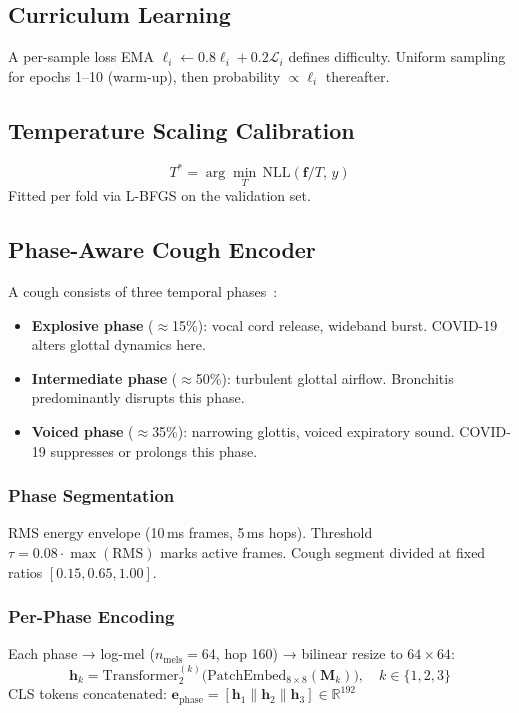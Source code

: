 \documentclass[journal]{IEEEtran}
\newcommand{\R}{\mathbb{R}}
\newcommand{\Lc}{\mathcal{L}}
\begin{document}
\subsection{Curriculum Learning}
\label{sec:curriculum}

A per-sample loss EMA $\ell_i \leftarrow 0.8\ell_i + 0.2\Lc_i$
defines difficulty. Uniform sampling for epochs 1--10 (warm-up),
then probability $\propto \ell_i$ thereafter.

\subsection{Temperature Scaling Calibration}
\label{sec:calibration}

\begin{equation}
T^* = \arg\min_T\,\mathrm{NLL}(\mathbf{f}/T,\,y)
\label{eq:calibration}
\end{equation}
Fitted per fold via L-BFGS on the validation set.

\subsection{Phase-Aware Cough Encoder}
\label{sec:phase}

A cough consists of three temporal phases~\cite{shi2018phases}:
\begin{itemize}
\item \textbf{Explosive phase} ($\approx$15\%): vocal cord release,
wideband burst. COVID-19 alters glottal dynamics here.
\item \textbf{Intermediate phase} ($\approx$50\%): turbulent glottal
airflow. Bronchitis predominantly disrupts this phase.
\item \textbf{Voiced phase} ($\approx$35\%): narrowing glottis,
voiced expiratory sound. COVID-19 suppresses or prolongs this phase.
\end{itemize}

\subsubsection{Phase Segmentation}
RMS energy envelope (10\,ms frames, 5\,ms hops). Threshold
$\tau = 0.08 \cdot \max(\text{RMS})$ marks active frames.
Cough segment divided at fixed ratios $[0.15, 0.65, 1.00]$.

\subsubsection{Per-Phase Encoding}
Each phase → log-mel ($n_\text{mels}{=}64$, hop 160) → bilinear
resize to $64{\times}64$:
\begin{equation}
\mathbf{h}_k = \mathrm{Transformer}^{(k)}_2
               \bigl(\mathrm{PatchEmbed}_{8\times8}(\mathbf{M}_k)\bigr),
\quad k \in \{1,2,3\}
\label{eq:phase_enc}
\end{equation}
CLS tokens concatenated:
$\mathbf{e}_\text{phase} = [\mathbf{h}_1 \| \mathbf{h}_2 \| \mathbf{h}_3] \in \R^{192}$
\end{document}
